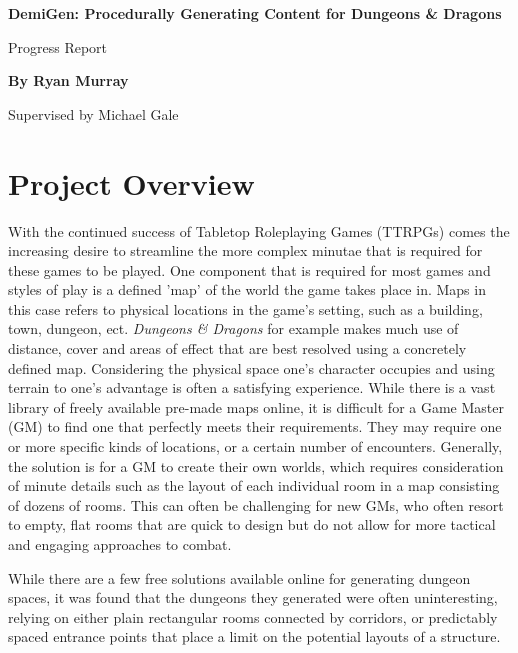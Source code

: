 \documentclass{article}
\begin{document}
\thispagestyle{plain}
\begin{center}
    \Large
    \textbf{DemiGen: Procedurally Generating Content for Dungeons \& Dragons}
 
    \vspace{0.4cm}
    \large
    Progress Report
 
    \vspace{0.4cm}
    \textbf{By Ryan Murray}

    \vspace{0.4cm}
    \large
    Supervised by Michael Gale
\end{center}

\section{Project Overview}

With the continued success of Tabletop Roleplaying Games (TTRPGs) comes the increasing desire to streamline the more complex minutae that is required for these games to be played. One component that is required for most games and styles of play is a defined 'map' of the world the game takes place in. Maps in this case refers to physical locations in the game's setting, such as a building, town, dungeon, ect. \textit{Dungeons \& Dragons} for example makes much use of distance, cover and areas of effect that are best resolved using a concretely defined map. Considering the physical space one's character occupies and using terrain to one's advantage is often a satisfying experience. While there is a vast library of freely available pre-made maps online, it is difficult for a Game Master (GM) to find one that perfectly meets their requirements. They may require one or more specific kinds of locations, or a certain number of encounters. Generally, the solution is for a GM to create their own worlds, which requires consideration of minute details such as the layout of each individual room in a map consisting of dozens of rooms. This can often be challenging for new GMs, who often resort to empty, flat rooms that are quick to design but do not allow for more tactical and engaging approaches to combat. 



While there are a few free solutions available online for generating dungeon spaces, it was found that the dungeons they generated were often uninteresting, relying on either plain rectangular rooms connected by corridors, or predictably spaced entrance points that place a limit on the potential layouts of a structure.
\end{document}
